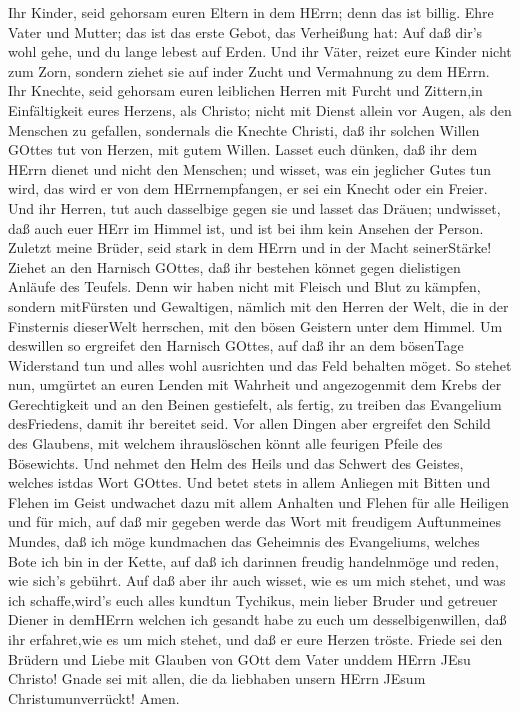  Ihr Kinder, seid gehorsam euren Eltern in dem HErrn; denn
das ist billig.  Ehre Vater und Mutter; das ist das erste
Gebot, das Verheißung hat:  Auf daß dir's wohl gehe, und du
lange lebest auf Erden.  Und ihr Väter, reizet eure Kinder
nicht zum Zorn, sondern ziehet sie auf inder Zucht und Vermahnung zu dem
HErrn.  Ihr Knechte, seid gehorsam euren leiblichen Herren
mit Furcht und Zittern,in Einfältigkeit eures Herzens, als Christo;
 nicht mit Dienst allein vor Augen, als den Menschen zu
gefallen, sondernals die Knechte Christi, daß ihr solchen Willen GOttes
tut von Herzen, mit gutem Willen.  Lasset euch dünken, daß
ihr dem HErrn dienet und nicht den Menschen;  und wisset,
was ein jeglicher Gutes tun wird, das wird er von dem HErrnempfangen, er
sei ein Knecht oder ein Freier.  Und ihr Herren, tut auch
dasselbige gegen sie und lasset das Dräuen; undwisset, daß auch euer
HErr im Himmel ist, und ist bei ihm kein Ansehen der Person.
 Zuletzt meine Brüder, seid stark in dem HErrn und in der
Macht seinerStärke!  Ziehet an den Harnisch GOttes, daß ihr
bestehen könnet gegen dielistigen Anläufe des Teufels. 
Denn wir haben nicht mit Fleisch und Blut zu kämpfen, sondern mitFürsten
und Gewaltigen, nämlich mit den Herren der Welt, die in der Finsternis
dieserWelt herrschen, mit den bösen Geistern unter dem Himmel.
 Um deswillen so ergreifet den Harnisch GOttes, auf daß ihr
an dem bösenTage Widerstand tun und alles wohl ausrichten und das Feld
behalten möget.  So stehet nun, umgürtet an euren Lenden
mit Wahrheit und angezogenmit dem Krebs der Gerechtigkeit 
und an den Beinen gestiefelt, als fertig, zu treiben das Evangelium
desFriedens, damit ihr bereitet seid.  Vor allen Dingen
aber ergreifet den Schild des Glaubens, mit welchem ihrauslöschen könnt
alle feurigen Pfeile des Bösewichts.  Und nehmet den Helm
des Heils und das Schwert des Geistes, welches istdas Wort GOttes.
 Und betet stets in allem Anliegen mit Bitten und Flehen im
Geist undwachet dazu mit allem Anhalten und Flehen für alle Heiligen
 und für mich, auf daß mir gegeben werde das Wort mit
freudigem Auftunmeines Mundes, daß ich möge kundmachen das Geheimnis des
Evangeliums,  welches Bote ich bin in der Kette, auf daß
ich darinnen freudig handelnmöge und reden, wie sich's gebührt.
 Auf daß aber ihr auch wisset, wie es um mich stehet, und
was ich schaffe,wird's euch alles kundtun Tychikus, mein lieber Bruder
und getreuer Diener in demHErrn  welchen ich gesandt habe
zu euch um desselbigenwillen, daß ihr erfahret,wie es um mich stehet,
und daß er eure Herzen tröste.  Friede sei den Brüdern und
Liebe mit Glauben von GOtt dem Vater unddem HErrn JEsu Christo!
 Gnade sei mit allen, die da liebhaben unsern HErrn JEsum
Christumunverrückt! Amen.
